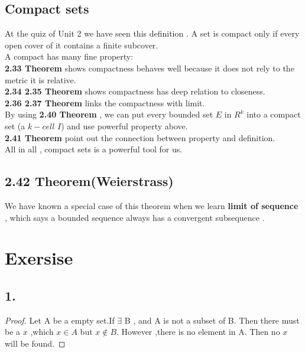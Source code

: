 \documentclass{report}
\begin{document}
            \subsection*{Compact sets}
            At the quiz of Unit 2 we have seen this definition . A set is compact only if every open cover of it contains a finite subcover.\\
            A compact has many fine property:\\
            \newline
            \textbf{2.33 Theorem} shows compactness behaves well because it does not rely to the metric it is relative.\\
            \textbf{2.34 2.35 Theorem} shows compactness has  deep relation to closeness.\\
            \textbf{2.36 2.37 Theorem} links the compactness with limit.\\
            By using \textbf{2.40 Theorem} , we can put every bounded set $E$ in $R^k$ into a compact set (a $k-cell$ $I$) and use powerful property above.\\
            \textbf{2.41 Theorem} point out the connection between property and definition.\\
            \newline
            All in all , compact sets is a powerful tool for us.

            \subsection*{2.42 Theorem(Weierstrass)}
            We have known a special case of this theorem when we learn \textbf{limit of sequence} , 
            which says a bounded sequence always has a convergent subsequence .


            

        \section*{Exersise}
            \subsection*{1.}
                \begin{proof}
                    Let A be a empty set.If $\exists$ B , and A is not a subset of B.
                    Then there must be a $\mathit{x}$ ,which $ x \in A$ but $ x \notin B$.
                    However ,there is no element in A. Then no $x$ will be found.
                \end{proof}
\end{document}
